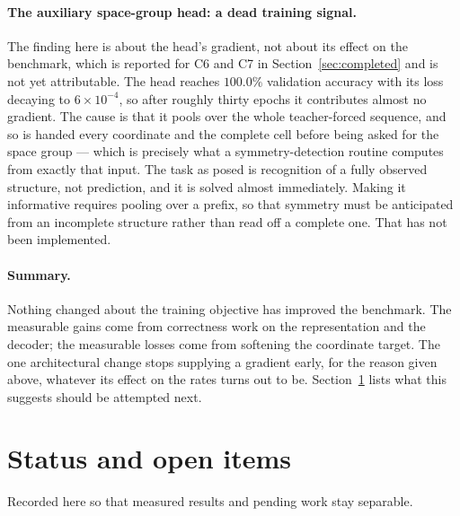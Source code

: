 \documentclass[manuscript,screen,review]{acmart}
\begin{document}
\paragraph{The auxiliary space-group head: a dead training signal.}
The finding here is about the head's gradient, not about its effect on the
benchmark, which is reported for C6 and C7 in Section~\ref{sec:completed} and is
not yet attributable. The head reaches $100.0\%$ validation accuracy with its
loss decaying to $6\times10^{-4}$, so after roughly thirty epochs it contributes
almost no gradient. The cause is that
it pools over the whole teacher-forced sequence, and so is handed every
coordinate and the complete cell before being asked for the space group --- which
is precisely what a symmetry-detection routine computes from exactly that input.
The task as posed is recognition of a fully observed structure, not prediction,
and it is solved almost immediately. Making it informative requires pooling over
a prefix, so that symmetry must be anticipated from an incomplete structure
rather than read off a complete one. That has not been implemented.

\paragraph{Summary.}
Nothing changed about the training objective has improved the benchmark. The
measurable gains come from correctness work on the representation and the
decoder; the measurable losses come from softening the coordinate target. The
one architectural change stops supplying a gradient early, for the reason given
above, whatever its effect on the rates turns out to be.
Section~\ref{sec:status} lists what this suggests should be attempted next.

\section{Status and open items}
\label{sec:status}

Recorded here so that measured results and pending work stay separable.
\end{document}

